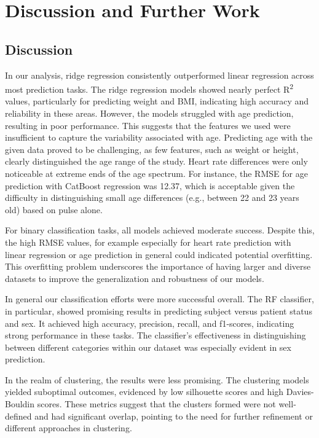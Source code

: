  \chapter{Discussion and Further Work}
\label{cha:discussion}

\section{Discussion}

In our analysis, ridge regression consistently outperformed linear regression across most prediction tasks. The ridge regression models showed nearly perfect R\textsuperscript{2} values, particularly for predicting weight and BMI, indicating high accuracy and reliability in these areas. However, the models struggled with age prediction, resulting in poor performance. This suggests that the features we used were insufficient to capture the variability associated with age. Predicting age with the given data proved to be challenging, as few features, such as weight or height, clearly distinguished the age range of the study. Heart rate differences were only noticeable at extreme ends of the age spectrum. For instance, the RMSE for age prediction with CatBoost regression was 12.37, which is acceptable given the difficulty in distinguishing small age differences (e.g., between 22 and 23 years old) based on pulse alone.

For binary classification tasks, all models achieved moderate success. Despite this, the high RMSE values, for example especially for heart rate prediction with linear regression or age prediction in general could indicated potential overfitting. This overfitting problem underscores the importance of having larger and diverse datasets to improve the generalization and robustness of our models.

In general our classification efforts were more successful overall. The RF classifier, in particular, showed promising results in predicting subject versus patient status and sex. It achieved high accuracy, precision, recall, and f1-scores, indicating strong performance in these tasks. The classifier's effectiveness in distinguishing between different categories within our dataset was especially evident in sex prediction.

In the realm of clustering, the results were less promising. The clustering models yielded suboptimal outcomes, evidenced by low silhouette scores and high Davies-Bouldin scores. These metrics suggest that the clusters formed were not well-defined and had significant overlap, pointing to the need for further refinement or different approaches in clustering.

